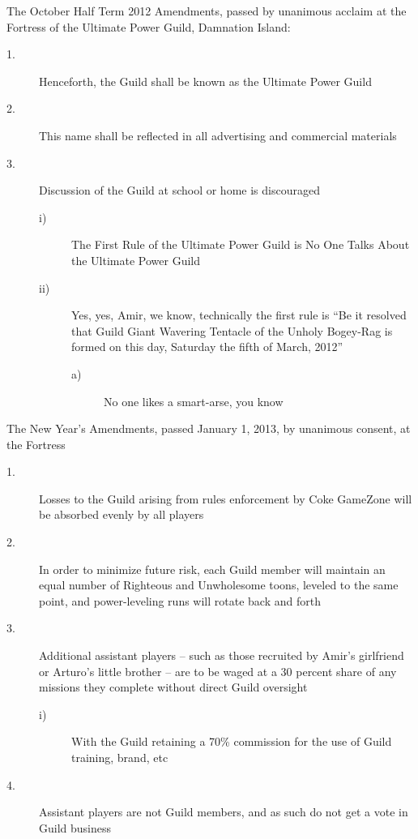 \tb

The October Half Term 2012 Amendments, passed by unanimous acclaim at 
the Fortress of the Ultimate Power Guild, Damnation Island:

\begin{description}
\item[1.] Henceforth, the Guild shall be known as the Ultimate Power Guild

\item[2.] This name shall be reflected in all advertising and commercial 
materials

\item[3.] Discussion of the Guild at school or home is discouraged

\begin{description}
\item[i)] The First Rule of the Ultimate Power 
Guild is No One Talks About the Ultimate Power Guild 


\item[ii)] Yes, yes, Amir, we know, technically 
the first rule is “Be it resolved that Guild Giant Wavering Tentacle 
of the Unholy Bogey-Rag is formed on this day, Saturday the fifth of 
March, 2012” 

\begin{description}
\item[a)] No one likes a smart-arse, you know 

\end{description}
\end{description}
\end{description}

\tb

The New Year's Amendments, passed January 1, 2013, by unanimous 
consent, at the Fortress

\begin{description}
\item[1.] Losses to the Guild arising from rules enforcement by Coke GameZone 
will be absorbed evenly by all players

\item[2.] In order to minimize future risk, each Guild member will maintain an 
equal number of Righteous and Unwholesome toons, leveled to the same 
point, and power-leveling runs will rotate back and forth

\item[3.] Additional assistant players -- such as those recruited by Amir's 
girlfriend or Arturo's little brother -- are to be waged at a 30 
percent share of any missions they complete without direct Guild 
oversight

\begin{description}
\item[i)] With the Guild retaining a 70\% 
commission for the use of Guild training, brand, etc 

\end{description}

\item[4.] Assistant players are not Guild members, and as such do not get a 
vote in Guild business
\end{description}

